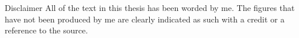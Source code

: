 \begin{abstractpage}{Disclaimer}
        All of the text in this thesis has been worded by me.
        The figures that have not been produced by me are clearly indicated as such with a credit or a reference to the source.

    \end{abstractpage}
